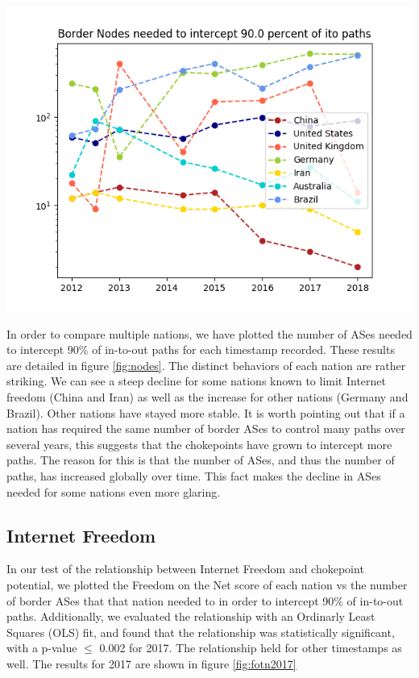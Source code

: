 \documentclass{article}
\newenvironment{Figure}
  {\par\medskip\noindent\minipage{\linewidth}}
  {\endminipage\par\medskip}
\begin{document}
\begin{multicols}{2}
\begin{Figure}
	\centering
	\includegraphics[width=\linewidth]{NodesNeeded}
	\label{fig:nodes}
\end{Figure}


\par
In order to compare multiple nations, we have plotted the number of ASes needed to intercept 90\% of in-to-out paths
for each timestamp recorded. These results are detailed in figure \ref{fig:nodes}.
The distinct behaviors of each nation are rather striking. We can see a steep decline for some
nations known to limit Internet freedom (China and Iran) as well as the increase for other nations
(Germany and Brazil). Other nations have stayed more stable. It is worth pointing out that if a nation
has required the same number of border ASes to control many paths over several years, this suggests
that the chokepoints have grown to intercept more paths. The reason for this is that the number of ASes,
and thus the number of paths, has increased globally over time. This fact makes the decline in ASes
needed for some nations even more glaring.


\subsection{Internet Freedom}

In our test of the relationship between Internet Freedom and chokepoint potential, we plotted the Freedom on the Net score
of each nation vs the number of border ASes that that nation needed to in order to intercept 90\% of in-to-out paths. Additionally,
we evaluated the relationship with an Ordinarly Least Squares (OLS) fit, and found that the relationship was statistically significant,
with a p-value $\leq$ 0.002 for 2017. The relationship held for other timestamps as well. The results for 2017 are shown in figure \ref{fig:fotn2017}


\end{multicols}
\end{document}
